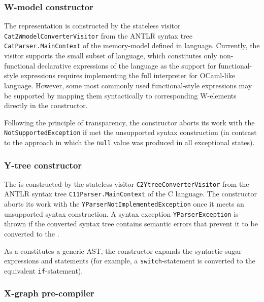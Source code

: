 \subsubsection{W-model constructor}
\label{ch:impl:proc:w-constr}

The \wmodel{} representation is constructed by the stateless visitor \texttt{Cat2WmodelConverterVisitor} from the ANTLR syntax tree \texttt{CatParser.MainContext} of the memory-model defined in \cat{} language.
Currently, the visitor supports the small subset of \cat{} language, which constitutes only non-functional declarative expressions of the language as the support for functional-style expressions requires implementing the full interpreter for OCaml-like language.
However, some most commonly used functional-style expressions may be supported by mapping them syntactically to corresponding W-elements directly in the \wmodel{} constructor.

Following the principle of transparency, the \wmodel{} constructor aborts its work with the \texttt{NotSupportedException} if met the unsupported syntax construction (in contrast to the \porthos[1] approach in which the \texttt{null} value was produced in all exceptional states).



\subsubsection{Y-tree constructor}
\label{ch:impl:proc:y-constr}

The \ytree{} is constructed by the stateless visitor \texttt{C2YtreeConverterVisitor} from the ANTLR syntax tree \texttt{C11Parser.MainContext} of the C language.
The \ytree{} constructor aborts its work with the \texttt{YParserNotImplementedException} once it meets an unsupported syntax construction.
A syntax exception \texttt{YParserException} is thrown if the converted syntax tree contains semantic errors that prevent it to be converted to the \ytree{}.

As a \ytree{} constitutes a generic AST, the \ytree{} constructor expands the syntactic sugar expressions and statements (for example, a \texttt{switch}-statement is converted to the equivalent \texttt{if}-statement).


\subsubsection{X-graph pre-compiler}
\label{ch:impl:proc:x-pre-compiler}

